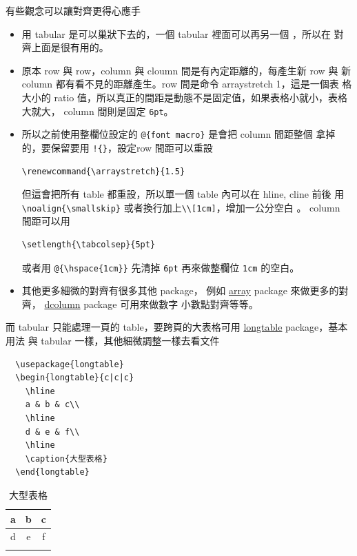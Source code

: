   有些觀念可以讓對齊更得心應手
  \begin{itemize}
    \item 用 tabular 是可以巢狀下去的，一個 tabular 裡面可以再另一個 ，所以在
      對齊上面是很有用的。
    \item 原本 row 與 row，column 與 cloumn 間是有內定距離的，每產生新 row 與
      新 column 都有看不見的距離產生。row 間是命令 arraystretch 1，這是一個表
      格大小的 ratio 值，所以真正的間距是動態不是固定值，如果表格小就小，表格
      大就大， column 間則是固定 \verb=6pt=。
    \item 所以之前使用整欄位設定的 \verb=@{font macro}= 是會把 column 間距整個
      拿掉的，要保留要用 \verb=!{}=，設定row 間距可以重設
      \begin{verbatim}
\renewcommand{\arraystretch}{1.5}
      \end{verbatim}
      但這會把所有 table 都重設，所以單一個 table 內可以在 hline, cline 前後
      用\verb=\noalign{\smallskip}= 或者換行加上\verb=\\[1cm]=，增加一公分空白
      。 column 間距可以用
      \begin{verbatim}
\setlength{\tabcolsep}{5pt}
      \end{verbatim}
      或者用 \verb=@{\hspace{1cm}}= 先清掉 \verb=6pt= 再來做整欄位 \verb=1cm=
      的空白。
    \item 其他更多細微的對齊有很多其他 package， 例如
      \href{https://texdoc.org/serve/array/0}{array} package 來做更多的對齊，
      \href{https://texdoc.org/serve/dcolumn/0}{dcolumn} package 可用來做數字
      小數點對齊等等。
  \end{itemize}
  而 tabular 只能處理一頁的 table，要跨頁的大表格可用
  \href{https://texdoc.org/serve/longtable.pdf/0}{longtable} package，基本用法
  與 tabular 一樣，其他細微調整一樣去看文件
  \begin{verbatim}
  \usepackage{longtable}
  \begin{longtable}{c|c|c}
    \hline 
    a & b & c\\
    \hline
    d & e & f\\
    \hline
    \caption{大型表格}
  \end{longtable}
  \end{verbatim}
  \begin{longtable}{c|c|c}
    \hline 
    a & b & c\\
    \hline
    d & e & f\\
    \hline
    \caption{大型表格}
  \end{longtable}

